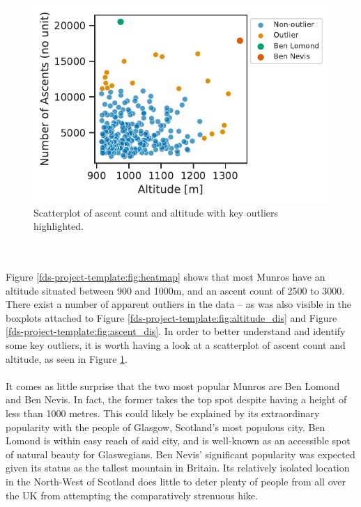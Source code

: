 \documentclass[11pt,a4paper]{article}
\begin{document}
\begin{figure} [h!]
  \centering
  \includegraphics{report/scatterplot.pdf}
  \caption{Scatterplot of ascent count and altitude with key outliers highlighted.}
  \label{fds-project-template:fig:scatterplot}
\end{figure} \\ \\
Figure \ref{fds-project-template:fig:heatmap} shows that most Munros have an altitude situated between 900 and 1000m, and an ascent count of 2500 to 3000. There exist a number of apparent outliers in the data – as was also visible in the boxplots attached to Figure \ref{fds-project-template:fig:altitude_dis} and Figure \ref{fds-project-template:fig:ascent_dis}. In order to better understand and identify some key outliers, it is worth having a look at a scatterplot of ascent count and altitude, as seen in Figure \ref{fds-project-template:fig:scatterplot}. \\ \\
It comes as little surprise that the two most popular Munros are Ben Lomond and Ben Nevis. In fact, the former takes the top spot despite having a height of less than 1000 metres. This could likely be explained by its extraordinary popularity with the people of Glasgow, Scotland's most populous city. Ben Lomond is within easy reach of said city, and is well-known as an accessible spot of natural beauty for Glaswegians. Ben Nevis' significant popularity was expected given its status as the tallest mountain in Britain. Its relatively isolated location in the North-West of Scotland does little to deter plenty of people from all over the UK from attempting the comparatively strenuous hike. \\ \\
\end{document}
